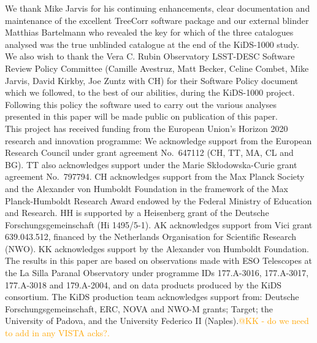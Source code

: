 \documentclass{aa}
\newcommand{\bg}[1]{\textcolor{orange}{#1}}
\begin{document}
\begin{acknowledgements}
We thank Mike Jarvis for his continuing enhancements, clear documentation and maintenance of the excellent {\sc TreeCorr} software package and our external blinder Matthias Bartelmann who revealed the key for which of the three catalogues analysed was the true unblinded catalogue at the end of the KiDS-1000 study.   We also wish to thank the Vera C. Rubin Observatory LSST-DESC Software Review Policy Committee (Camille Avestruz, Matt Becker, Celine Combet, Mike Jarvis, David Kirkby, Joe Zuntz with CH) for their Software Policy document which we followed, to the best of our abilities, during the KiDS-1000 project.   Following this policy the software used to carry out the various analyses presented in this paper will be made public on publication of this paper.\\

This project has received funding from the European Union's Horizon 2020 research and innovation programme: We acknowledge support from the European Research Council under grant agreement No.~647112 (CH, TT, MA, CL and BG). TT also acknowledges support under the Marie Sk\l{}odowska-Curie grant agreement No.~797794. CH acknowledges support from the Max Planck Society and the Alexander von Humboldt Foundation in the framework of the Max Planck-Humboldt Research Award endowed by the Federal Ministry of Education and Research. HH is supported by a Heisenberg grant of the Deutsche Forschungsgemeinschaft (Hi 1495/5-1). AK acknowledges support from Vici grant 639.043.512, financed by the Netherlands Organisation for Scientific Research (NWO). KK acknowledges support by the Alexander von Humboldt Foundation.\\
%
The results in this paper are based on observations made with ESO Telescopes at the La Silla Paranal Observatory under programme IDs 177.A-3016, 177.A-3017, 177.A-3018 and 179.A-2004, and on data products produced by the KiDS consortium. The KiDS production team acknowledges support from: Deutsche Forschungsgemeinschaft, ERC, NOVA and NWO-M grants; Target; the University of Padova, and the University Federico II (Naples).\bg{@KK - do we need to add in any VISTA acks?.}\\


\end{acknowledgements}
\end{document}
